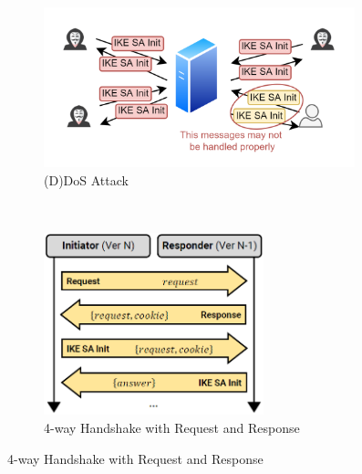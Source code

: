 \begin{figure}[H]
\centering
\begin{subfigure}{\textwidth}
  \centering
  \includegraphics[width=0.99\textwidth]{image/ikedos.png}
  \caption{(D)DoS Attack}
  \label{fig:ikedos}
\end{subfigure}\\
\begin{subfigure}{\textwidth}
  \centering
  \includegraphics[width=0.7\textwidth]{image/ikedosprevent.png}
  \caption{4-way Handshake with Request and Response}
  \label{fig:ikedosprev}
\end{subfigure}
\end{figure}

